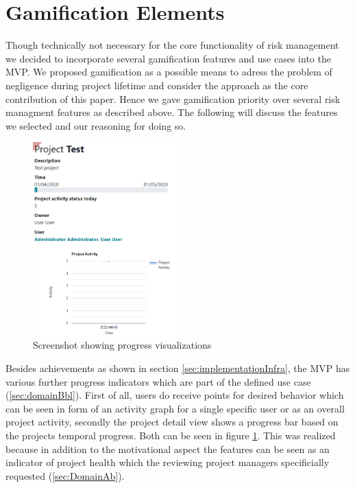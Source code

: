 
\section{Gamification Elements}
\label{sec:implementationGami}

Though technically not necessary for the core functionality of risk management we decided to incorporate several gamification features and use cases into the \ac{MVP}. We proposed gamification as a possible means to adress the problem of negligence during project lifetime and consider the approach as the core contribution of this paper. Hence we gave gamification priority over several risk managment features as described above. The following will discuss the features we selected and our reasoning for doing so.

\begin{figure}
	\includegraphics[width=0.5\textwidth]{Assets/implementation_shots/projectdetail.png}
	\caption{Screenshot showing progress visualizations}
	\label{fig:projectdetail}
\end{figure}

Besides achievements as shown in section \ref{sec:implementationInfra}, the \ac{MVP} has various further progress indicators which are part of the defined use case (\ref{sec:domainBbl}). First of all, users do receive points for desired behavior which can be seen in form of an activity graph for a single specific user or as an overall project activity, secondly the project detail view shows a progress bar based on the projects temporal progress. Both can be seen in figure \ref{fig:projectdetail}. This was realized because in addition to the motivational aspect the features can be seen as an indicator of project health which the reviewing project managers specificially requested (\ref{sec:DomainAb}).

